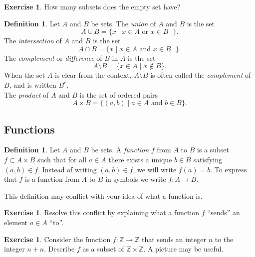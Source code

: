 \documentclass[12pt]{article}
\theoremstyle{definition}
\newtheorem{definition}[theorem]{\color{forrest}Definition}
\newtheorem{exercise}[theorem]{\color{orange}Exercise}
\numberwithin{equation}{subsection}
\begin{document}
\begin{exercise}  How many subsets does the empty set have?
\end{exercise}





\begin{definition}  Let $A$ and $B$ be sets.  The \emph{union} of $A$ and $B$ is the set
\[
A \cup B = \{x \mid \text{$x \in A$ or $x \in B$ } \}.
\]
The \emph{intersection} of $A$ and $B$ is the set
\[
A \cap B = \{ x \mid \text{$x \in A$ and $x \in B$ } \}.
\]
The \emph{complement} or \emph{difference} of $B$ in $A$ is the set
\[
A \setminus B = \{ x \in A \mid x \notin B \}.
\]
When the set $A$ is clear from the context, $A \setminus B$ is often called the \emph{complement} of $B$, and is written $B^{c}$. \\

\noindent The \emph{product} of $A$ and $B$ is the set of ordered pairs
\[
A \times B = \{ (a, b) \mid \text{$a \in A$ and $b \in B$} \}.
\]
\end{definition}


\subsection*{Functions}

\begin{definition} Let $A$ and $B$ be sets.  A \emph{function} $f$ from $A$ to $B$ is a subset $f \subset A \times B$ such that for all $a \in A$ there exists a unique $b \in B$ satisfying $(a, b) \in f$.  Instead of writing $(a, b) \in f$, we will write $f(a) = b$.  To express that $f$ is a function from $A$ to $B$ in symbols we write $f \colon A \rightarrow B$.  
\end{definition}

This definition may conflict with your idea of what a function is.  

\begin{exercise}  Resolve this conflict by explaining what a function $f$ ``sends'' an element $a \in A$ ``to''.
\end{exercise}

\begin{exercise}  Consider the function $f \colon \mathbb{Z} \rightarrow \mathbb{Z}$ that sends an integer $n$ to the integer $n + n$.  Describe $f$ as a subset of $\mathbb{Z} \times \mathbb{Z}$.  A picture may be useful.
\end{exercise}
\end{document}
